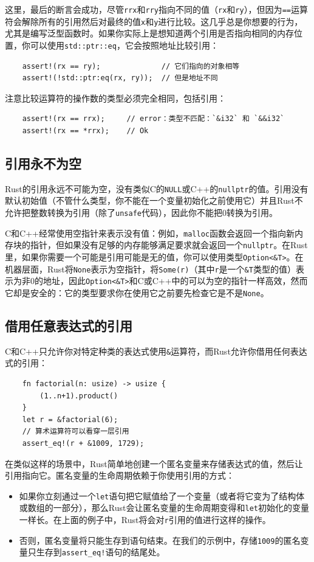 这里，最后的断言会成功，尽管\texttt{rrx}和\texttt{rry}指向不同的值（\texttt{rx}和\texttt{ry}），但因为\texttt{==}运算符会解除所有的引用然后对最终的值\texttt{x}和\texttt{y}进行比较。这几乎总是你想要的行为，尤其是编写泛型函数时。如果你实际上是想知道两个引用是否指向相同的内存位置，你可以使用\texttt{std::ptr::eq}，它会按照地址比较引用：
\begin{verbatim}
    assert!(rx == ry);              // 它们指向的对象相等
    assert!(!std::ptr:eq(rx, ry));  // 但是地址不同
\end{verbatim}

注意比较运算符的操作数的类型必须完全相同，包括引用：
\begin{verbatim}
    assert!(rx == rrx);     // error：类型不匹配：`&i32` 和 `&&i32`
    assert!(rx == *rrx);    // Ok
\end{verbatim}

\subsection{引用永不为空}
Rust的引用永远不可能为空，没有类似C的\texttt{NULL}或C++的\texttt{nullptr}的值。引用没有默认初始值（不管什么类型，你不能在一个变量初始化之前使用它）并且Rust不允许把整数转换为引用（除了\texttt{unsafe}代码），因此你不能把0转换为引用。

C和C++经常使用空指针来表示没有值：例如，\texttt{malloc}函数会返回一个指向新内存块的指针，但如果没有足够的内存能够满足要求就会返回一个\texttt{nullptr}。在Rust里，如果你需要一个可能是引用可能是无的值，你可以使用类型\texttt{Option<\&T>}。在机器层面，Rust将\texttt{None}表示为空指针，将\texttt{Some(r)}（其中\texttt{r}是一个\texttt{\&T}类型的值）表示为非0的地址，因此\texttt{Option<\&T>}和C或C++中的可以为空的指针一样高效，然而它却是安全的：它的类型要求你在使用它之前要先检查它是不是\texttt{None}。

\subsection{借用任意表达式的引用}
C和C++只允许你对特定种类的表达式使用\texttt{\&}运算符，而Rust允许你借用任何表达式的引用：
\begin{verbatim}
    fn factorial(n: usize) -> usize {
        (1..n+1).product()
    }
    let r = &factorial(6);
    // 算术运算符可以看穿一层引用
    assert_eq!(r + &1009, 1729);
\end{verbatim}

在类似这样的场景中，Rust简单地创建一个匿名变量来存储表达式的值，然后让引用指向它。匿名变量的生命周期依赖于你使用引用的方式：
\begin{itemize}
    \item 如果你立刻通过一个\texttt{let}语句把它赋值给了一个变量（或者将它变为了结构体或数组的一部分），那么Rust会让匿名变量的生命周期变得和\texttt{let}初始化的变量一样长。在上面的例子中，Rust将会对\texttt{r}引用的值进行这样的操作。
    \item 否则，匿名变量将只能生存到语句结束。在我们的示例中，存储\texttt{1009}的匿名变量只生存到\texttt{assert\_eq!}语句的结尾处。
\end{itemize}

